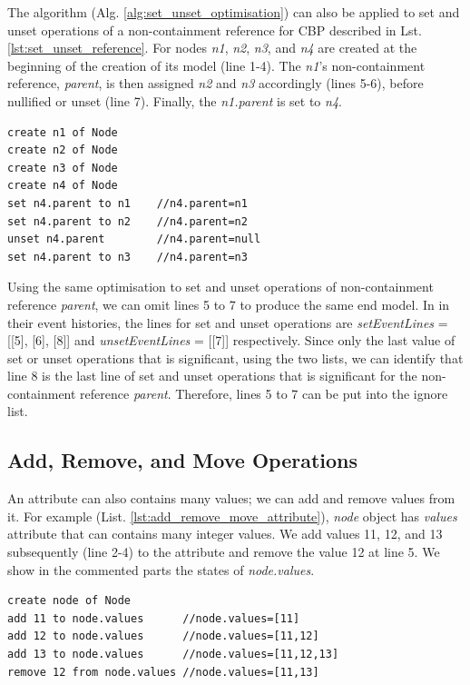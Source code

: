 \documentclass{llncs}
\begin{document}
The algorithm (Alg. \ref{alg:set_unset_optimisation}) can also be applied to set and unset operations of a non-containment reference for CBP described in Lst. \ref{lst:set_unset_reference}. For nodes \emph{n1}, \emph{n2}, \emph{n3}, and \emph{n4} are created at the beginning of the creation of its model (line 1-4). The \emph{n1}'s non-containment reference, \emph{parent}, is then assigned \emph{n2} and \emph{n3} accordingly (lines 5-6), before nullified or unset (line 7). Finally, the \emph{n1.parent} is set to \emph{n4}. 

\begin{lstlisting}[style=eol,caption={Example of CBP representation of \emph{name} reference assignments.},label=lst:set_unset_reference]
create n1 of Node
create n2 of Node
create n3 of Node
create n4 of Node
set n4.parent to n1    //n4.parent=n1
set n4.parent to n2    //n4.parent=n2
unset n4.parent        //n4.parent=null
set n4.parent to n3    //n4.parent=n3
\end{lstlisting}

Using the same optimisation to set and unset operations of non-containment reference \emph{parent}, we can omit lines 5 to 7 to produce the same end model. In in their event histories, the lines for set and unset operations are \emph{setEventLines} = [[5], [6], [8]] and \emph{unsetEventLines} = [[7]] respectively. Since only the last value of set or unset operations that is significant, using the two lists, we can identify that line 8 is the last line of set and unset operations that is significant for the non-containment reference \emph{parent}. Therefore, lines 5 to 7 can be put into the ignore list.

\subsection{Add, Remove, and Move Operations}
\label{subsec:add_remove_and_move_operations}
An attribute can also contains many values; we can add and remove values from it. For example (List. \ref{lst:add_remove_move_attribute}), \emph{node} object has \emph{values} attribute that can contains many integer values. We add values 11, 12, and 13 subsequently (line 2-4) to the attribute and remove the value 12 at line 5. We show in the commented parts the states of \emph{node.values}.  

\begin{lstlisting}[style=eol,caption={Example of CBP representation of attribute \emph{values}'s add and remove operations.},label=lst:add_remove_move_attribute]
create node of Node
add 11 to node.values      //node.values=[11] 
add 12 to node.values      //node.values=[11,12] 
add 13 to node.values      //node.values=[11,12,13] 
remove 12 from node.values //node.values=[11,13] 
\end{lstlisting}
\end{document}
